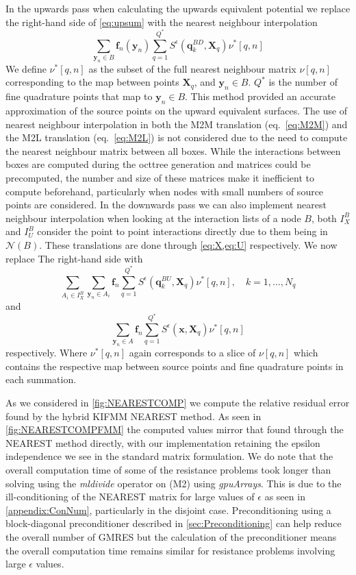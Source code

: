 In the upwards pass when calculating the upwards equivalent potential we replace the right-hand side of \cref{eq:upsum} with the nearest neighbour interpolation
\begin{equation*}
    \sum_{{\bm{y}}_{n} \in B} \bm{f}_{n}({\bm{y}}_n) \sum_{q=1}^{Q^*}S^{\epsilon}\left({\bm{q}}^{BD}_{k}, {\bm{X}}_{q}\right) \nu^*[q,n]
\end{equation*}
We define $\nu^*[q,n]$ as the subset of the full nearest neighbour matrix $\nu[q,n]$ corresponding to the map between points ${\bm{X}}_{q}$, and ${\bm{y}}_{n} \in B$. $Q^*$ is the number of fine quadrature points that map to ${\bm{y}}_{n} \in B$. This method provided an accurate approximation of the source points on the upward equivalent surfaces. The use of nearest neighbour interpolation in both the M2M translation (eq.~\ref{eq:M2M}) and the M2L translation (eq.~\ref{eq:M2L}) is not considered due to the need to compute the nearest neighbour matrix between all boxes. While the interactions between boxes are computed during the octtree generation and matrices could be precomputed, the number and size of these matrices make it inefficient to compute beforehand, particularly when nodes with small numbers of source points are considered. 
In the downwards pass we can also implement nearest neighbour interpolation when looking at the interaction lists of a node $B$, both $I_X^B$ and $I_U^B$ consider the point to point interactions directly due to them being in $\mathcal{N}(B)$. These translations are done through \cref{eq:X,eq:U} respectively. We now replace The right-hand side with 
\begin{equation*}
    \sum_{A_i \in I_X^B} \sum_{{\bm{y}}_n\in A_i} {\bm{f}}_{n} \sum_{q=1}^{Q^*} S^\epsilon\left(\bm{q}^{BU}_{k}, {\bm{X}}_{q}\right) \nu^*[q,n], \quad k=1,\dots,N_q
\end{equation*}
and
\begin{equation*}
    \sum_{{\bm{y}}_n\in A}{\bm{f}}_n \sum_{q=1}^{Q^*} S^\epsilon(\bm{x},{\bm{X}}_q) \nu^*[q,n]
\end{equation*}
respectively. Where $\nu^*[q,n]$ again corresponds to a slice of $\nu[q,n]$ which contains the respective map between source points and fine quadrature points in each summation.

As we considered in \cref{fig:NEARESTCOMP} we compute the relative residual error found by the hybrid KIFMM NEAREST method. As seen in \cref{fig:NEARESTCOMPFMM} the computed values mirror that found through the NEAREST method directly, with our implementation retaining the epsilon independence we see in the standard matrix formulation. We do note that the overall computation time of some of the resistance problems took longer than solving using the \textit{mldivide} operator on (M2) using \textit{gpuArrays}. This is due to the ill-conditioning of the NEAREST matrix for large values of $\epsilon$ as seen in \cref{appendix:ConNum}, particularly in the disjoint case. Preconditioning using a block-diagonal preconditioner described in \cref{sec:Preconditioning} can help reduce the overall number of GMRES but the calculation of the preconditioner means the overall computation time remains similar for resistance problems involving large $\epsilon$ values. 

